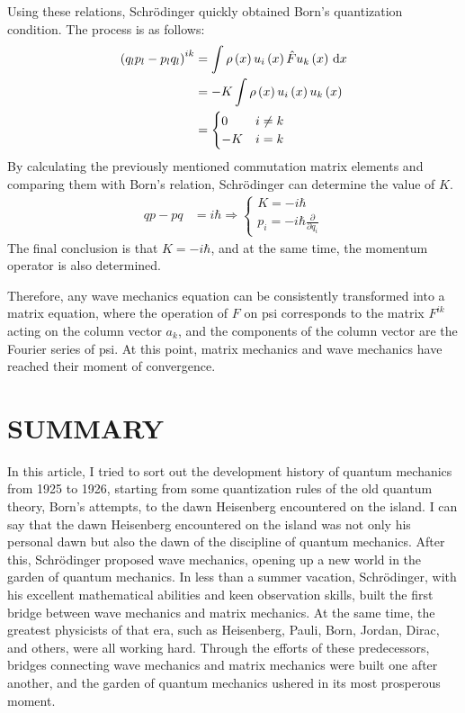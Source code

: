 \documentclass[a4paper, 12pt, oneside, onecolumn]{article}
\newcommand{\cald}{{\rm d}}
\begin{document}
\begin{multicols}{2}
Using these relations, Schrödinger quickly obtained Born's quantization condition. The process is as follows:
\begin{align}
	\left( q_l p_l - p_l q_l \right)^{ik}
	&= \int \rho \left( x \right) u_i \left( x \right) \hat F u_k \left( x \right) \,\cald x \nonumber \\
	&= - K \int \rho \left( x \right) u_i \left( x \right) u_k \left( x \right) \nonumber \\
	&=
	\begin{cases}
		0  & i \neq k \\
		-K & i = k
	\end{cases}
\end{align}
By calculating the previously mentioned commutation matrix elements and comparing them with Born's relation, Schrödinger can determine the value of $K$.
\begin{align}
	qp - pq
	&= i \hbar \Rightarrow
	\begin{cases}
		K   = - i \hbar \\
		p_i = - i \hbar \frac{\partial}{\partial q_i}
	\end{cases}
\end{align}
The final conclusion is that $K = - i \hbar$, and at the same time, the momentum operator is also determined.

Therefore, any wave mechanics equation can be consistently transformed into a matrix equation, where the operation of $F$ on psi corresponds to the matrix $F^{ik}$ acting on the column vector $a_k$, and the components of the column vector are the Fourier series of psi. At this point, matrix mechanics and wave mechanics have reached their moment of convergence.
\section{SUMMARY}
In this article, I tried to sort out the development history of quantum mechanics from 1925 to 1926, starting from some quantization rules of the old quantum theory, Born's attempts, to the dawn Heisenberg encountered on the island. I can say that the dawn Heisenberg encountered on the island was not only his personal dawn but also the dawn of the discipline of quantum mechanics. After this, Schrödinger proposed wave mechanics, opening up a new world in the garden of quantum mechanics. In less than a summer vacation, Schrödinger, with his excellent mathematical abilities and keen observation skills, built the first bridge between wave mechanics and matrix mechanics. At the same time, the greatest physicists of that era, such as Heisenberg, Pauli, Born, Jordan, Dirac, and others, were all working hard. Through the efforts of these predecessors, bridges connecting wave mechanics and matrix mechanics were built one after another, and the garden of quantum mechanics ushered in its most prosperous moment.

\end{multicols}
\end{document}
